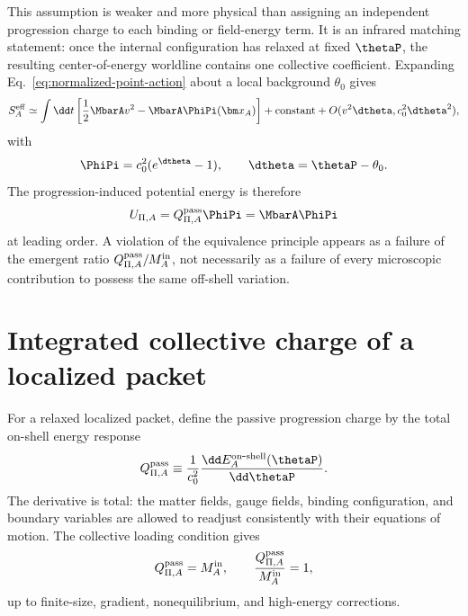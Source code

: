 \documentclass[12pt]{article}
\begin{document}
This assumption is weaker and more physical than assigning an independent progression charge to each binding or field-energy term.  It is an infrared matching statement: once the internal configuration has relaxed at fixed \(\thetaP\), the resulting center-of-energy worldline contains one collective coefficient.  Expanding Eq.~\eqref{eq:normalized-point-action} about a local background \(\theta_0\) gives
\begin{equation}
    S_A^{\rm eff}\simeq \int\dd t\left[\frac12 \MbarA v^2-\MbarA\PhiPi(\bm x_A)\right]
    +\text{constant}
    +O(v^2\dtheta,c_0^2\dtheta^2),
    \label{eq:normalized-nonrel-action}
\end{equation}
with
\begin{equation}
    \PhiPi=c_0^2(e^{\dtheta}-1),
    \qquad
    \dtheta=\thetaP-\theta_0 .
    \label{eq:normalized-Phi-universal}
\end{equation}
The progression-induced potential energy is therefore
\begin{equation}
    U_{\Pi,A}=Q_{\Pi,A}^{\rm pass}\PhiPi
    =\MbarA\PhiPi
    \label{eq:normalized-potential-energy}
\end{equation}
at leading order.  A violation of the equivalence principle appears as a failure of the emergent ratio \(Q_{\Pi,A}^{\rm pass}/M_A^{\rm in}\), not necessarily as a failure of every microscopic contribution to possess the same off-shell variation.

\section{Integrated collective charge of a localized packet}

For a relaxed localized packet, define the passive progression charge by the total on-shell energy response
\begin{equation}
    Q_{\Pi,A}^{\rm pass}\equiv
    \frac{1}{c_0^2}
    \frac{\dd E_A^{\rm on\mbox{-}shell}(\thetaP)}{\dd\thetaP} .
    \label{eq:Qpi-def-normalized}
\end{equation}
The derivative is total: the matter fields, gauge fields, binding configuration, and boundary variables are allowed to readjust consistently with their equations of motion.  The collective loading condition gives
\begin{equation}
    Q_{\Pi,A}^{\rm pass}=M_A^{\rm in},
    \qquad
    \frac{Q_{\Pi,A}^{\rm pass}}{M_A^{\rm in}}=1,
    \label{eq:Qpi-universal-normalized}
\end{equation}
up to finite-size, gradient, nonequilibrium, and high-energy corrections.
\end{document}
